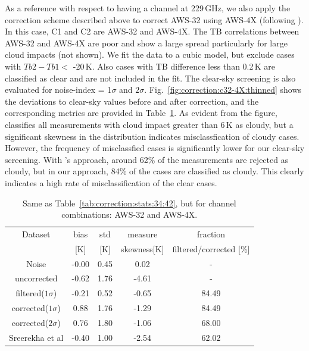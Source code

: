 \documentclass[12pt]{article}
\begin{document}
As a reference with respect to having a channel at 229\,GHz, we also apply the
correction scheme described above to correct AWS-32 using AWS-4X (following
\citet{rekha2012potential}). In this case, C1 and C2 are AWS-32 and AWS-4X. The
TB correlations between AWS-32 and AWS-4X are poor and show a large spread
particularly for large cloud impacts (not shown). We fit the data to a
cubic model, but exclude cases with $Tb2-Tb1 <$ -20\,K. Also cases with TB
difference less than 0.2\,K are classified as clear and are not included in the
fit. The clear-sky screening is also evaluated for noise-index = 1$\sigma$ and
$2\sigma$. Fig.~\ref{fig:correction:c32-4X:thinned} shows the deviations to
clear-sky values before and after correction, and the corresponding metrics are
provided in Table~\ref{tab:correction:stats:32:4X}. As evident from the figure,
\cite{rekha2012potential} classifies all measurements with cloud impact greater
than 6\,K as cloudy, but a significant skewness in the distribution indicates
misclassfication of cloudy cases. However, the frequency of misclassfied cases
is significantly lower for our clear-sky screening. With
\cite{rekha2012potential}'s approach, around 62\% of the measurements are
rejected as cloudy, but in our approach, 84\% of the cases are classified as
cloudy. This clearly indicates a high rate of misclassification of the clear
cases.
\begin{table}[!h]
	\centering
	\begin{tabular}[b]{c|c|c|c|c}
		Dataset  		  &   bias &   std &   measure & fraction \\
		&   [K]  &   [K] & skewness[K] 		& filtered/corrected [\%]\\
		\hline
Noise             &  -0.00 &  0.45 &               0.02 &                - \\
uncorrected       &  -0.62 &  1.76 &              -4.61 &                - \\
filtered($1\sigma$)  &  -0.21 &  0.52 &              -0.65 &               84.49 \\
corrected($1\sigma$) &   0.88 &  1.76 &              -1.29 &               84.49 \\
corrected($2\sigma$) &   0.76 &  1.80 &              -1.06 &               68.00 \\
Sreerekha et al   &  -0.40 &  1.00 &              -2.54 &               62.02 \\
		\hline
	\end{tabular}
	\caption{Same as Table~\ref{tab:correction:stats:34:42}, but for channel combinations: AWS-32 and AWS-4X.   }
	\label{tab:correction:stats:32:4X}
\end{table}
\end{document}
